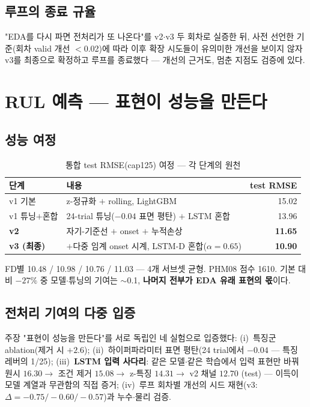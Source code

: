 \documentclass[11pt]{article}
\begin{document}
\subsection{루프의 종료 규율}

"EDA를 다시 파면 전처리가 또 나온다"를 v2$\cdot$v3 두 회차로 실증한 뒤,
사전 선언한 기준(회차 valid 개선 $<$0.02)에 따라 이후 확장 시도들이 유의미한 개선을 보이지 않자
v3를 최종으로 확정하고 루프를 종료했다 — 개선의 근거도, 멈춘 지점도 검증에 있다.

\section{RUL 예측 — 표현이 성능을 만든다}

\subsection{성능 여정}

\begin{table}[H]
\centering
\caption{통합 test RMSE(cap125) 여정 — 각 단계의 원천}
\begin{tabular}{llr}
\toprule
단계 & 내용 & test RMSE \\
\midrule
v1 기본 & z-정규화 $+$ rolling, LightGBM & 15.02 \\
v1 튜닝$+$혼합 & 24-trial 튜닝($-0.04$ 표면 평탄) $+$ LSTM 혼합 & 13.96 \\
\textbf{v2} & 자기-기준선 $+$ onset $+$ 누적손상 & \textbf{11.65} \\
\textbf{v3 (최종)} & $+$다중 임계 onset 시계, LSTM-D 혼합($\alpha{=}0.65$) & \textbf{10.90} \\
\bottomrule
\end{tabular}
\end{table}

FD별 10.48 / 10.98 / 10.76 / 11.03 — 4개 서브셋 균형. PHM08 점수 1610.
기본 대비 $-27\%$ 중 모델$\cdot$튜닝의 기여는 $\sim$0.1, \textbf{나머지 전부가 EDA 유래 표현의 몫}이다.

\subsection{전처리 기여의 다중 입증}

주장 "표현이 성능을 만든다"를 서로 독립인 네 실험으로 입증했다:
(i)~특징군 ablation(제거 시 $+2.6$);
(ii)~하이퍼파라미터 표면 평탄(24 trial에서 $-0.04$ — 특징 레버의 1/25);
(iii)~\textbf{LSTM 입력 사다리}: 같은 모델$\cdot$같은 학습에서 입력 표현만 바꿔
원시 $16.30 \to$ 조건 제거 $15.08 \to$ z-특징 $14.31 \to$ v2 채널 $12.70$ (test) —
이득이 모델 계열과 무관함의 직접 증거;
(iv)~루프 회차별 개선의 시드 재현(v3: $\Delta{=}-0.75/-0.60/-0.57$)과 누수$\cdot$물리 검증.
\end{document}
